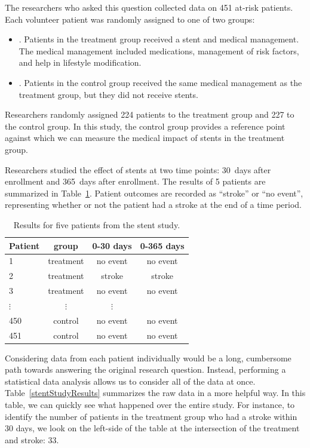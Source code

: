 The researchers who asked this question collected data on 451 at-risk patients. Each volunteer patient was randomly assigned to one of two groups:
\begin{itemize}
\item[]. Patients in the treatment group received a stent and medical management. The medical management included medications, management of risk factors, and help in lifestyle modification.
\item[]. Patients in the control group received the same medical management as the treatment group, but they did not receive stents.
\end{itemize}
Researchers randomly assigned 224 patients to the treatment group and 227 to the control group. In this study, the control group provides a reference point against which we can measure the medical impact of stents in the treatment group.

Researchers studied the effect of stents at two time points: 30~days after enrollment and 365~days after enrollment. The results of 5 patients are summarized in Table~\ref{stentStudyResultsDF}. Patient outcomes are recorded as ``stroke'' or ``no event'', representing whether or not the patient had a stroke at the end of a time period.

\begin{table}[h]
\centering
\begin{tabular}{l ccc}
\hline
Patient	&	group	&	0-30 days 	&	0-365 days \\
\hline
1		&	treatment &	no event &	no event \\
2		&	treatment &	stroke & stroke \\
3		&	treatment &	no event & no event \\
$\vdots$	&	$\vdots$	  &	$\vdots$ \\
450	&	control &	no event &	no event \\
451	&	control &	no event &	no event \\
\hline
\end{tabular}
\caption{Results for five patients from the stent study.}
\label{stentStudyResultsDF}
\end{table}

Considering data from each patient individually would be a long, cumbersome path towards answering the original research question. Instead, performing a statistical data analysis allows us to consider all of the data at once. Table~\ref{stentStudyResults} summarizes the raw data in a more helpful way. In this table, we can quickly see what happened over the entire study. For instance, to identify the number of patients in the treatment group who had a stroke within 30 days, we look on the left-side of the table at the intersection of the treatment and stroke: 33.


